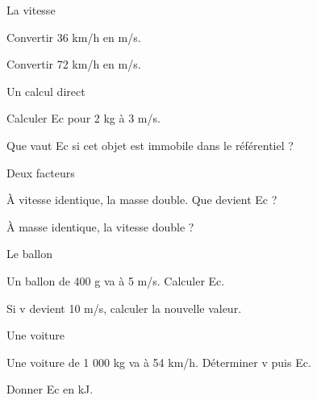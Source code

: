 \par\noindent\begin{minipage}{\linewidth}
\begin{exercice}[1]{La vitesse}
\begin{questions}
\item Convertir 36 km/h en m/s.
\item Convertir 72 km/h en m/s.
\end{questions}
\end{exercice}
\end{minipage}
\par\noindent\begin{minipage}{\linewidth}
\begin{exercice}[1]{Un calcul direct}
\begin{questions}
\item Calculer Ec pour 2 kg à 3 m/s.
\item Que vaut Ec si cet objet est immobile dans le référentiel ?
\end{questions}
\end{exercice}
\end{minipage}
\par\noindent\begin{minipage}{\linewidth}
\begin{exercice}[1]{Deux facteurs}
\begin{questions}
\item À vitesse identique, la masse double. Que devient Ec ?
\item À masse identique, la vitesse double ?
\end{questions}
\end{exercice}
\end{minipage}
\clearpage{}
\par\noindent\begin{minipage}{\linewidth}
\begin{exercice}[2]{Le ballon}
\begin{questions}
\item Un ballon de 400 g va à 5 m/s. Calculer Ec.
\item Si v devient 10 m/s, calculer la nouvelle valeur.
\end{questions}
\end{exercice}
\end{minipage}
\par\noindent\begin{minipage}{\linewidth}
\begin{exercice}[2]{Une voiture}
\begin{questions}
\item Une voiture de 1 000 kg va à 54 km/h. Déterminer v puis Ec.
\item Donner Ec en kJ.
\end{questions}
\end{exercice}
\end{minipage}
